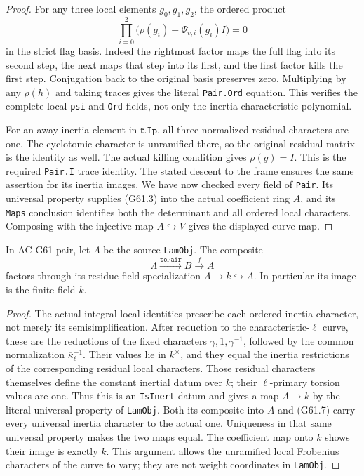 \begin{proof}
For any three local elements \(g_0,g_1,g_2\), the ordered product
\[
       \prod_{i=0}^2\bigl(\rho(g_i)-\Psi_{v,i}(g_i)I\bigr)=0
 \tag{G61.6}
\]
in the strict flag basis.  Indeed the rightmost factor maps the
full flag into its second step, the next maps that step into its
first, and the first factor kills the first step.  Conjugation
back to the original basis preserves zero.  Multiplying by any
\(\rho(h)\) and taking traces gives the literal
\texttt{Pair.Ord} equation.  This verifies the complete local
\texttt{psi} and \texttt{Ord} fields, not only the inertia
characteristic polynomial.

For an away-inertia element in \(\mathfrak r.\texttt{Ip}\), all
three normalized residual characters are one.  The cyclotomic
character is unramified there, so the original residual matrix is
the identity as well.  The actual killing condition gives
\(\rho(g)=I\).  This is the required
\texttt{Pair.I} trace identity.  The stated descent to the frame
ensures the same assertion for its inertia images.
We have now checked every field of \texttt{Pair}.
Its universal property supplies (G61.3) into the actual coefficient
ring \(A\), and its \texttt{Maps} conclusion identifies both the
determinant and all ordered local characters.  Composing with the
injective map \(A\hookrightarrow V\) gives the displayed curve map.
\end{proof}

\begin{proposition}
\label{AC-G61-weight}
In AC-G61-pair, let \(\Lambda\) be the source
\texttt{LamObj}.  The composite
\[
        \Lambda\xrightarrow{\texttt{toPair}}B
                  \xrightarrow{f}A
 \tag{G61.7}
\]
factors through its residue-field specialization
\(\Lambda\longrightarrow k\hookrightarrow A\).
In particular its image is the finite field \(k\).
\end{proposition}
\begin{proof}
The actual integral local identities prescribe each ordered inertia
character, not merely its semisimplification.  After reduction to
the characteristic-\(\ell\) curve, these are the reductions of
the fixed characters \(\gamma,1,\gamma^{-1}\), followed by
the common normalization \(\overline\kappa_\ell^{-1}\).
Their values lie in \(k^\times\), and they equal the inertia
restrictions of the corresponding residual local characters.
Those residual characters themselves define the constant inertial
datum over \(k\); their \(\ell\)-primary torsion values are one.
Thus this is an \texttt{IsInert} datum and gives a map
\(\Lambda\to k\) by the literal universal property of
\texttt{LamObj}.  Both its composite into \(A\) and (G61.7)
carry every universal inertia character to the actual one.
Uniqueness in that same universal property makes the two maps
equal.  The coefficient map onto \(k\) shows their image is
exactly \(k\).  This argument allows the unramified local
Frobenius characters of the curve to vary; they are not weight
coordinates in \texttt{LamObj}.
\end{proof}

